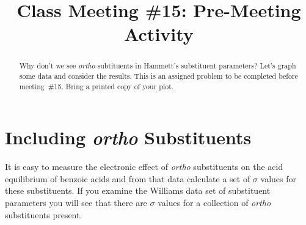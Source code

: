 \documentclass[]{tufte-handout}
\title{Class Meeting \#15: Pre-Meeting Activity}
\author[Barry Linkletter]{}
\date{} %
\begin{document}
\justifying


\maketitle%

\begin{abstract}

\noindent
Why don't we see \textit{ortho} subtituents in Hammett's substituent parameters? Let's graph some data and consider the results. This is an assigned problem to be completed before meeting~\#15. Bring a printed copy of your plot. 
\end{abstract}


\section{Including \textit{ortho} Substituents}\label{sec:plan}


It is easy to measure the electronic effect of \textit{ortho} substituents on the acid equilibrium of benzoic acids and from that data calculate a set of $\sigma$ values for these substituents. If you examine the Williams data set of substituent parameters
you will see that there are $\sigma$ values for a collection of \textit{ortho} substituents present.
\end{document}
